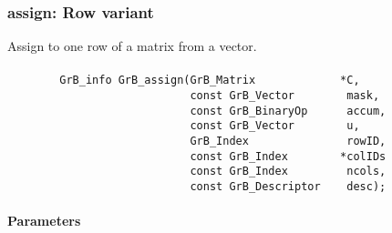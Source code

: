 \subsubsection{{\sf assign}: Row variant}

Assign to one row of a matrix from a vector.  

\paragraph{\syntax}

\begin{verbatim}
        GrB_info GrB_assign(GrB_Matrix             *C,
                            const GrB_Vector        mask,
                            const GrB_BinaryOp      accum,
                            const GrB_Vector        u,
                            GrB_Index               rowID,
                            const GrB_Index        *colIDs
                            const GrB_Index         ncols,
                            const GrB_Descriptor    desc); 
\end{verbatim}

\paragraph{Parameters}

